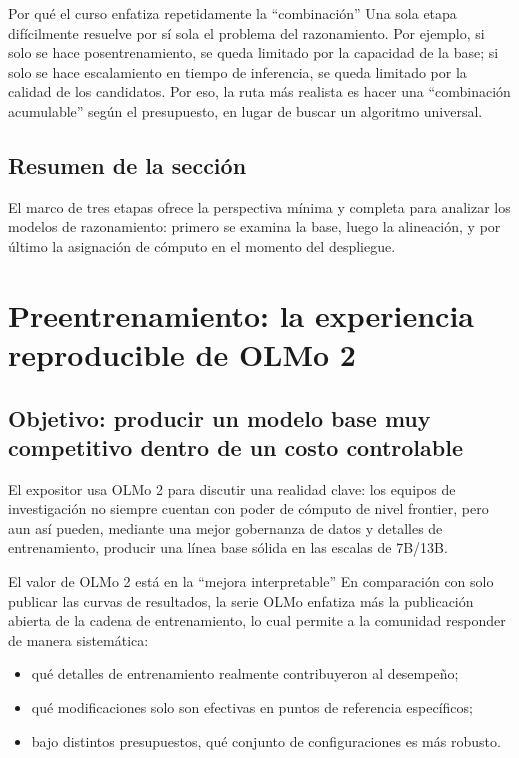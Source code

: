 \documentclass[a4paper]{article}
\begin{document}
\begin{knowledgebox}{Por qué el curso enfatiza repetidamente la ``combinación''}
Una sola etapa difícilmente resuelve por sí sola el problema del razonamiento. Por ejemplo, si solo se hace posentrenamiento, se queda limitado por la capacidad de la base; si solo se hace escalamiento en tiempo de inferencia, se queda limitado por la calidad de los candidatos. Por eso, la ruta más realista es hacer una ``combinación acumulable'' según el presupuesto, en lugar de buscar un algoritmo universal.
\end{knowledgebox}

\subsection{Resumen de la sección}
El marco de tres etapas ofrece la perspectiva mínima y completa para analizar los modelos de razonamiento: primero se examina la base, luego la alineación, y por último la asignación de cómputo en el momento del despliegue.


\section{Preentrenamiento: la experiencia reproducible de OLMo 2}

\subsection{Objetivo: producir un modelo base muy competitivo dentro de un costo controlable}
El expositor usa OLMo 2 para discutir una realidad clave: los equipos de investigación no siempre cuentan con poder de cómputo de nivel frontier, pero aun así pueden, mediante una mejor gobernanza de datos y detalles de entrenamiento, producir una línea base sólida en las escalas de 7B/13B.

\begin{importantbox}{El valor de OLMo 2 está en la ``mejora interpretable''}
En comparación con solo publicar las curvas de resultados, la serie OLMo enfatiza más la publicación abierta de la cadena de entrenamiento, lo cual permite a la comunidad responder de manera sistemática:
\begin{itemize}
    \item qué detalles de entrenamiento realmente contribuyeron al desempeño;
    \item qué modificaciones solo son efectivas en puntos de referencia específicos;
    \item bajo distintos presupuestos, qué conjunto de configuraciones es más robusto.
\end{itemize}
\end{importantbox}
\end{document}
